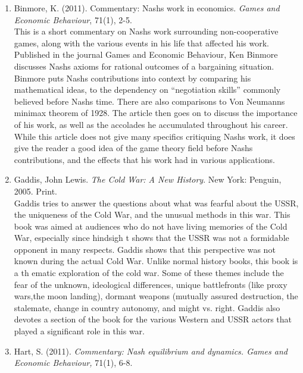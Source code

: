 \documentclass[11pt]{article}
\begin{document}
\begin{enumerate}

\item Binmore, K. (2011). Commentary: Nash\textsc{}s work in economics. \textit{Games and Economic Behaviour}, 71(1), 2-5.\\

This is a short commentary on Nash\textsc{}s work surrounding non-cooperative games, along with the various events in his life that affected his work. Published in the journal Games and Economic Behaviour, Ken Binmore discusses Nash\textsc{}s axioms for rational outcomes of a bargaining situation. Binmore puts Nash\textsc{}s contributions into context by comparing his mathematical ideas, to the dependency on “negotiation skills” commonly believed before Nash\textsc{}s time. There are also comparisons to Von Neumann\textsc{}s minimax theorem of 1928. The article then goes on to discuss the importance of his work, as well as the accolades he accumulated throughout his career. While this article does not give many specifics critiquing Nash\textsc{}s work, it does give the reader a good idea of the game theory field before Nash\textsc{}s contributions, and the effects that his work had in various applications.\\

\item Gaddis, John Lewis.  \textit{The Cold War: A New History}. New York: Penguin, 2005. Print.\\
 
Gaddis tries to answer the questions about what was fearful about the USSR, the uniqueness of the Cold War, and the unusual methods in this war. This book was aimed at audiences who do not have living memories of the Cold War, especially since hindsigh
t shows that the USSR was not a formidable opponent in many respects. Gaddis shows that this perspective was not known during the actual Cold War. Unlike normal history books, this book is a th
ematic exploration of the cold war. Some of these themes include the fear of the unknown, ideological differences, unique battlefronts (like proxy wars,the moon landing), dormant weapons (mutually assured destruction, the stalemate, change in country 
autonomy, and might vs. right. Gaddis also devotes a section of the book for the various Western and USSR actors that played a significant role in this war.\\

\item Hart, S. (2011). \textit{Commentary: Nash equilibrium and dynamics. Games and Economic Behaviour,} 71(1), 6-8.\\


\end{enumerate}
\end{document}
